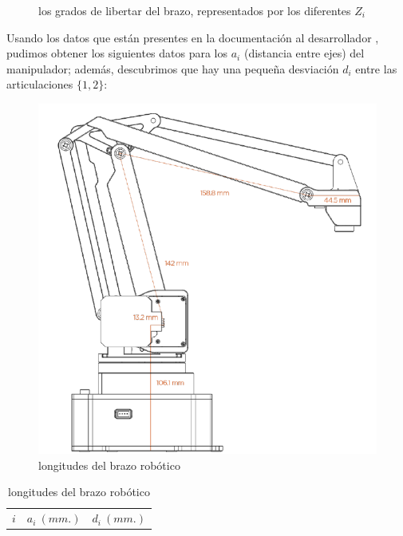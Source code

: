 \documentclass[a4paper,12pt]{article}
\begin{document}
\begin{figure}[H]
\begin{minipage}{.48\linewidth}
        \caption{los grados de libertar del brazo, representados por los diferentes $Z_i$}
        \label{fig:axis}
    \end{minipage}
\end{figure}

Usando los datos que están presentes en la documentación al desarrollador \cite{noauthor_uarm_2019-1},
pudimos obtener los siguientes datos para los $a_i$ (distancia entre ejes) del manipulador; además,
descubrimos que hay una pequeña desviación $d_i$ entre las articulaciones $\{1, 2\}$:

\begin{table}[ht]
    \begin{minipage}{.49\linewidth}
        \begin{figure}[H]
            \centering
            \includegraphics[width=\linewidth]{images/sizes.png}
            \caption{longitudes del brazo robótico \cite{noauthor_uarm_2019-1}}
            \label{fig:sizes}
        \end{figure}
    \end{minipage}
    \hfill
    \begin{minipage}{.49\linewidth}
        \centering
        \begin{tabular}{|| c | c c ||}
            \hline
            $i$ & $a_i~(mm.)$ & $d_i~(mm.)$ \\ [0.5ex]

\end{tabular}
\end{minipage}
\end{table}
\end{document}
